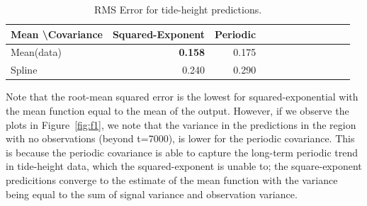 \documentclass[11pt]{report}
\begin{document}
\begin{table}[h]
\begin{center}
\begin{tabular}{|l||r|r|r|r|r|r|r|r|r|r|r|}
\hline
Mean \textbackslash Covariance & Squared-Exponent & Periodic\\\hline\hline
Mean(data) & \textbf{0.158} &   0.175 \\\hline
Spline     & 0.240 &   0.290 \\\hline
\end{tabular}
\caption{RMS Error for tide-height predictions.}
\label{tab1}
\end{center}
\end{table}Note that the root-mean squared error is the lowest for squared-exponential with the mean function equal to the mean of the output. However, if we observe the plots in Figure~\ref{fig:f1}, we note that the variance in the predictions in the region with no observations (beyond t=7000), is lower for the periodic covariance. This is because the periodic covariance is able to capture the long-term periodic trend in tide-height data, which the squared-exponent is unable to; the square-exponent predicitions converge to the estimate of the mean function with the variance being equal to the sum of signal variance and observation variance.
\end{document}
